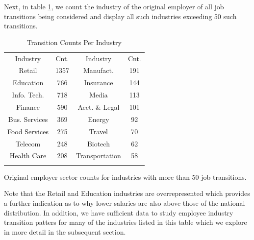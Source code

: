 \documentclass[10pt]{article}
\begin{document}
Next, in table \ref{tab:indtab}, we count the industry of the original employer 
of all job transitions being considered and display all such industries exceeding 
50 such transitions.
%
\begin{table}
  \centering
  \caption{Transition Counts Per Industry}
  \begin{tabular}{cccc}
    \rowcolor{gray!50}
      Industry & Cnt. & Industry & Cnt. \\
      Retail & 1357 & Manufact. & 191\\
      Education & 766 & Insurance & 144\\
      Info. Tech. & 718 & Media & 113\\
      Finance & 590 & Acct. \& Legal & 101\\
      Bus. Services & 369 & Energy & 92\\
      Food Services & 275  & Travel & 70\\
      Telecom & 248 & Biotech & 62\\
      Health Care & 208 & Transportation & 58\\
	\label{tab:indtab}
  \end{tabular}
Original employer sector counts for industries with more than 50 job transitions.
\end{table}
%
Note that the Retail and Education industries are overrepresented which 
provides a further indication as to why lower salaries are also above those of the 
national distribution. In addition, we have sufficient data to study employee industry 
transition patters for many of the industries listed in this table which 
we explore in more detail in the subsequent section.
\end{document}
